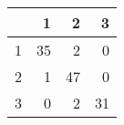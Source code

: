 \begin{tabular}{rrrr}
  \hline
 & 1 & 2 & 3 \\ 
  \hline
1 &  35 &   2 &   0 \\ 
  2 &   1 &  47 &   0 \\ 
  3 &   0 &   2 &  31 \\ 
   \hline
\end{tabular}
